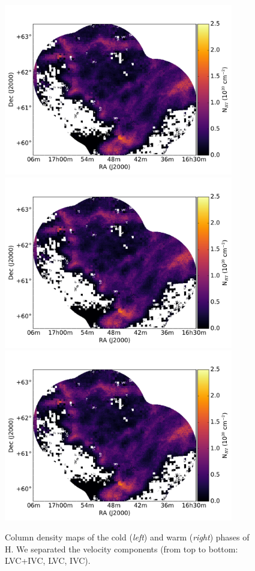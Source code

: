 \documentclass[traditabstract]{aa}
\begin{document}
\begin{figure}[h]
  \hspace{3mm}
  \includegraphics[page=5,height=7.5cm,trim=45 5 65 35,clip=true]{Figures/DHIGLS_NHI.pdf} \\
  \vspace{3mm}
  \includegraphics[page=3,height=7.5cm,trim=45 5 65 35,clip=true]{Figures/DHIGLS_NHI.pdf}
  \hspace{3mm}
  \includegraphics[page=6,height=7.5cm,trim=45 5 65 35,clip=true]{Figures/DHIGLS_NHI.pdf}
  \caption{Column density maps of the cold (\emph{left}) and warm (\emph{right}) phases of H. We separated the velocity components (from top to bottom: LVC+IVC, LVC, IVC).}
\end{figure}
\end{document}
